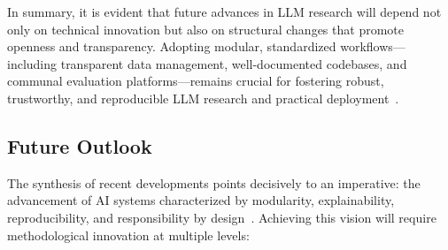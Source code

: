 In summary, it is evident that future advances in LLM research will depend not only on technical innovation but also on structural changes that promote openness and transparency. Adopting modular, standardized workflows—including transparent data management, well-documented codebases, and communal evaluation platforms—remains crucial for fostering robust, trustworthy, and reproducible LLM research and practical deployment~\cite{ref81,ref82,ref83,ref86,ref91}.

\subsection{Future Outlook}

The synthesis of recent developments points decisively to an imperative: the advancement of AI systems characterized by modularity, explainability, reproducibility, and responsibility by design~\cite{ref91,ref92,ref93,ref94,ref95,ref96,ref97,ref98,ref99,ref100,ref101,ref102,ref103,ref104,ref105,ref106,ref107,ref108}. Achieving this vision will require methodological innovation at multiple levels:

